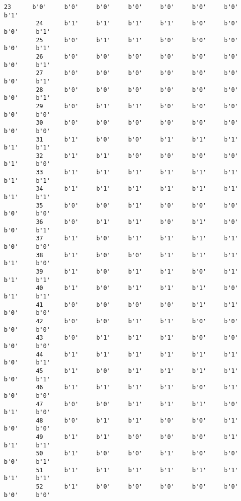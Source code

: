 \documentclass[11pt]{article}
\begin{document}
\begin{Verbatim}[commandchars=\\\{\}]
         23      b'0'     b'0'     b'0'     b'0'     b'0'     b'0'     b'0'     b'1'   
         24      b'1'     b'1'     b'1'     b'1'     b'0'     b'0'     b'0'     b'1'   
         25      b'0'     b'1'     b'1'     b'0'     b'0'     b'0'     b'0'     b'1'   
         26      b'0'     b'0'     b'0'     b'0'     b'0'     b'0'     b'0'     b'1'   
         27      b'0'     b'0'     b'0'     b'0'     b'0'     b'0'     b'0'     b'1'   
         28      b'0'     b'0'     b'0'     b'0'     b'0'     b'0'     b'0'     b'1'   
         29      b'0'     b'1'     b'1'     b'0'     b'0'     b'0'     b'0'     b'0'   
         30      b'0'     b'0'     b'0'     b'0'     b'0'     b'0'     b'0'     b'0'   
         31      b'1'     b'0'     b'0'     b'1'     b'1'     b'1'     b'1'     b'1'   
         32      b'1'     b'1'     b'0'     b'0'     b'0'     b'0'     b'1'     b'0'   
         33      b'1'     b'1'     b'1'     b'1'     b'1'     b'1'     b'1'     b'1'   
         34      b'1'     b'1'     b'1'     b'1'     b'1'     b'1'     b'1'     b'1'   
         35      b'0'     b'0'     b'1'     b'0'     b'0'     b'0'     b'0'     b'0'   
         36      b'0'     b'1'     b'1'     b'0'     b'1'     b'0'     b'0'     b'1'   
         37      b'1'     b'0'     b'1'     b'1'     b'1'     b'1'     b'0'     b'0'   
         38      b'1'     b'0'     b'0'     b'1'     b'1'     b'1'     b'1'     b'0'   
         39      b'1'     b'0'     b'1'     b'1'     b'0'     b'1'     b'1'     b'1'   
         40      b'1'     b'0'     b'1'     b'1'     b'1'     b'0'     b'1'     b'1'   
         41      b'0'     b'0'     b'0'     b'0'     b'1'     b'1'     b'0'     b'0'   
         42      b'0'     b'0'     b'1'     b'1'     b'0'     b'0'     b'0'     b'0'   
         43      b'0'     b'1'     b'1'     b'1'     b'0'     b'0'     b'0'     b'0'   
         44      b'1'     b'1'     b'1'     b'1'     b'1'     b'1'     b'0'     b'1'   
         45      b'1'     b'0'     b'1'     b'1'     b'1'     b'1'     b'0'     b'1'   
         46      b'1'     b'1'     b'1'     b'1'     b'0'     b'1'     b'0'     b'0'   
         47      b'0'     b'0'     b'1'     b'1'     b'1'     b'0'     b'1'     b'0'   
         48      b'0'     b'1'     b'1'     b'0'     b'0'     b'1'     b'0'     b'0'   
         49      b'1'     b'1'     b'0'     b'0'     b'0'     b'1'     b'1'     b'1'   
         50      b'1'     b'0'     b'0'     b'1'     b'0'     b'0'     b'0'     b'1'   
         51      b'1'     b'1'     b'1'     b'1'     b'1'     b'1'     b'1'     b'1'   
         52      b'1'     b'0'     b'0'     b'0'     b'0'     b'0'     b'0'     b'0'   

\end{Verbatim}
\end{document}
